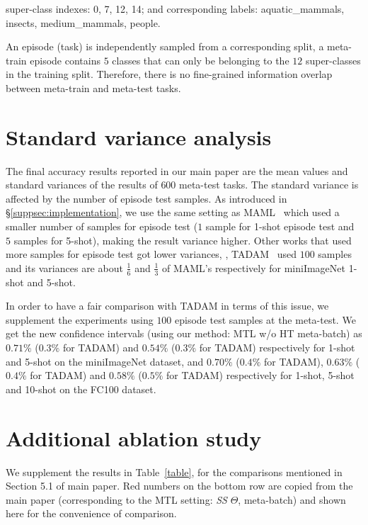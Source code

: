 super-class indexes: 0, 7, 12, 14; and
corresponding labels: aquatic\_mammals, insects, medium\_mammals, people.

An episode (task) is independently sampled from a corresponding split, \eg a meta-train episode contains $5$ classes that can only be belonging to the $12$ super-classes in the training split. Therefore, there is no fine-grained information overlap between meta-train and meta-test tasks.


\section{Standard variance analysis}
\label{suppsec:ci95}
The final accuracy results reported in our main paper are the mean values and standard variances of the results of $600$ meta-test tasks.
%
The standard variance is affected by the number of episode test samples.
%
As introduced in \S\ref{suppsec:implementation}, we use the same setting as MAML~\cite{FinnAL17} which used a smaller number of samples for episode test ($1$ sample for 1-shot episode test and $5$ samples for 5-shot), making the result variance higher.
%
%
Other works that used more samples for episode test got lower variances, \eg, TADAM~\cite{OreshkinNIPS18} used $100$ samples and its variances are about $\tfrac{1}{6}$ and $\tfrac{1}{3}$ of MAML's respectively for miniImageNet 1-shot and 5-shot.
%

In order to have a fair comparison with TADAM in terms of this issue, we supplement
the experiments using $100$ episode test samples at the meta-test.
%
We get the new confidence intervals (using our method: MTL w/o HT meta-batch) as $0.71\%$ ($0.3\%$ for TADAM) and $0.54\%$ ($0.3\%$ for TADAM) respectively for 1-shot and 5-shot on the miniImageNet dataset, and $0.70\%$ ($0.4\%$ for TADAM), $0.63\%$ ($0.4\%$ for TADAM) and $0.58\%$ ($0.5\%$ for TADAM) respectively for 1-shot, 5-shot and 10-shot on the FC100 dataset.

\section{Additional ablation study}
\label{suppsec:addexp}
We supplement the results in Table~\ref{table}, for the comparisons mentioned in Section 5.1 of main paper. 
%
Red numbers on the bottom row are copied from the main paper (corresponding to the MTL setting: \emph{SS} $\Theta$, meta-batch) and shown here for the convenience of comparison.

